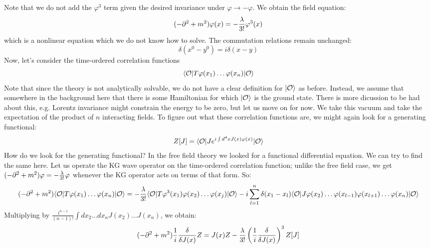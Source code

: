 Note that we do not add the $\varphi^3$ term given the desired invariance under $\varphi \to -\varphi$. We obtain the field equation:
\begin{equation}
    (-\p^2 + m^2)\varphi(x) = -\frac{\lambda}{3!}\varphi^3(x)
\end{equation}
which is a nonlinear equation which we do not know how to solve. The commutation relations remain unchanged:
\begin{equation}
    [\varphi(x), \dpd{}{y^0}\varphi(y)]\delta(x^0 - y^0) = i\delta(x - y)
\end{equation}
Now, let's consider the time-ordered correlation functions
\begin{equation}
    \bra{\O}T\varphi(x_1)\ldots\varphi(x_n)\ket{\O}
\end{equation}
Note that since the theory is not analytically solvable, we do not have a clear definition for $\lvert \mathcal{O} \rangle$ as before. Instead, we assume that somewhere in the background here that there is some Hamiltonian for which $\lvert \mathcal{O} \rangle$ is the ground state. There is more dicussion to be had about this, e.g. Lorentz invariance might constrain the energy to be zero, but let us move on for now. We take this vacuum and take the expectation of the product of $n$ interacting fields. To figure out what these correlation functions are, we might again look for a generating functional:
\begin{equation}
    Z[J] = \bra{\O}Je^{i\int d^4x J(x)\varphi(x)}\ket{\O}
\end{equation}
How do we look for the generating functional? In the free field theory we looked for a functional differential equation. We can try to find the same here. Let us operate the KG wave operator on the time-ordered correlation function; unlike the free field case, we get $(-\p^2 + m^2)\varphi = -\frac{\lambda}{3!}\varphi$ whenever the KG operator acts on terms of that form. So:
\begin{equation}
    (-\p^2 + m^2)\bra{\O}T\varphi(x_1)\ldots\varphi(x_n)\ket{\O} = -\frac{\lambda}{3!}\bra{\O}T\varphi^3(x_1)\varphi(x_2)\ldots\varphi(x_j)\ket{\O} - i\sum_{l=1}^n \delta(x_1 - x_l)\bra{\O}J\varphi(x_2)\ldots \varphi(x_{l-1})\varphi(x_{l+1})\ldots\varphi(x_n)\ket{\O}
\end{equation}
Multiplying by $\frac{i^{n-1}}{(n-1)!}\int dx_2 \ldots dx_n J(x_2)\ldots J(x_n)$, we obtain:
\begin{equation}
    (-\partial^2 + m^2)\frac{1}{i}\frac{\delta}{\delta J(x)}Z = J(x)Z - \frac{\lambda}{3!}\left(\frac{1}{i}\frac{\delta}{\delta J(x)}\right)^3Z[J]
\end{equation}
